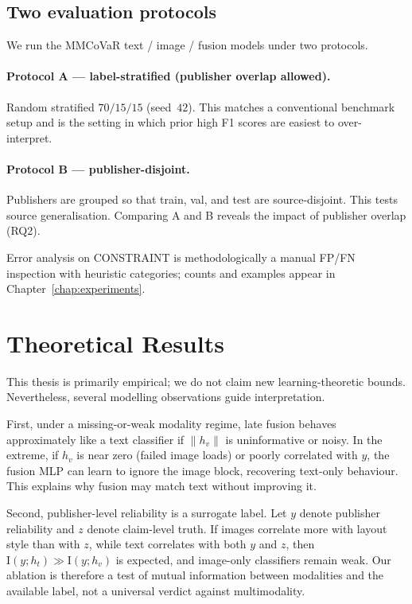 \documentclass[12pt, a4paper]{report}
\begin{document}
\subsection{Two evaluation protocols}
\label{sec:two-protocols}

We run the MMCoVaR text / image / fusion models under two protocols.

\paragraph{Protocol A --- label-stratified (publisher overlap allowed).}
Random stratified $70/15/15$ (seed~$42$).
This matches a conventional benchmark setup and is the setting in which prior high F1 scores are easiest to over-interpret.

\paragraph{Protocol B --- publisher-disjoint.}
Publishers are grouped so that train, val, and test are source-disjoint.
This tests source generalisation.
Comparing A and B reveals the impact of publisher overlap (RQ2).

Error analysis on CONSTRAINT is methodologically a manual FP/FN inspection with heuristic categories; counts and examples appear in Chapter~\ref{chap:experiments}.

\section{Theoretical Results}
\label{sec:theoretical-results}

This thesis is primarily empirical; we do not claim new learning-theoretic bounds.
Nevertheless, several modelling observations guide interpretation.

First, under a missing-or-weak modality regime, late fusion behaves approximately like a text classifier if $\|h_v\|$ is uninformative or noisy.
In the extreme, if $h_v$ is near zero (failed image loads) or poorly correlated with $y$, the fusion MLP can learn to ignore the image block, recovering text-only behaviour.
This explains why fusion may match text without improving it.

Second, publisher-level reliability is a surrogate label.
Let $y$ denote publisher reliability and $z$ denote claim-level truth.
If images correlate more with layout style than with $z$, while text correlates with both $y$ and $z$, then $\mathrm{I}(y;h_t) \gg \mathrm{I}(y;h_v)$ is expected, and image-only classifiers remain weak.
Our ablation is therefore a test of mutual information between modalities and the available label, not a universal verdict against multimodality.
\end{document}
